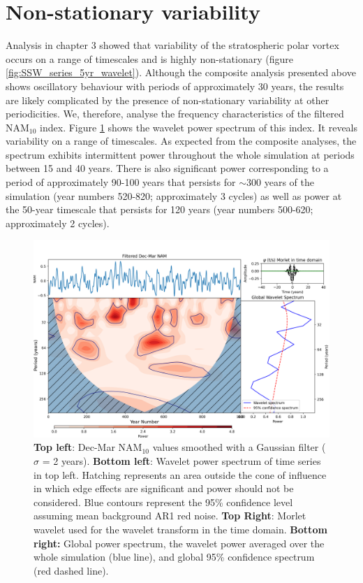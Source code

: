 \section{Non-stationary variability}
Analysis in chapter 3 showed that variability of the stratospheric polar vortex  occurs on a range of timescales and is highly non-stationary  (figure \ref{fig:SSW_series_5yr_wavelet}). Although the composite analysis presented above shows oscillatory behaviour with periods of approximately 30 years, the results are likely complicated by the presence of  non-stationary variability at other periodicities.  We, therefore, analyse the frequency characteristics of the filtered NAM$_{10}$ index. Figure \ref{NAM_wavelet} shows the wavelet power spectrum of this index. It reveals variability on a range of timescales. As expected from the composite analyses, the spectrum exhibits intermittent power throughout the whole simulation at periods between 15 and 40 years. There is also significant power corresponding to a period of approximately 90-100 years that persists for $\sim$300 years of the simulation (year numbers 520-820; approximately 3 cycles) as well as power at the 50-year timescale that persists for 120 years (year numbers 500-620; approximately 2 cycles). 

\begin{figure}[h!]
\begin{center}
\noindent\includegraphics[width = 0.8\linewidth]{Figures/Figures-surface/NAM_wavelet_UKESM.png}
\caption[Wavelet power spectrum of smoothed NAM$_{10}$ index]{\textbf{Top left}: Dec-Mar NAM$_{10}$ values smoothed with a Gaussian filter ($\sigma$ = 2 years). \textbf{Bottom left}: Wavelet power spectrum of time series in top left. Hatching represents an area outside the cone of influence in which edge effects are significant and power should not be considered. Blue contours represent the 95\% confidence level assuming mean background AR1 red noise. \textbf{Top Right}: Morlet wavelet used for the wavelet transform in the time domain. \textbf{Bottom right:} Global power spectrum, the wavelet power averaged over the whole simulation (blue line), and global 95\% confidence spectrum (red dashed line).}
\label{NAM_wavelet}
\end{center}
\end{figure}

